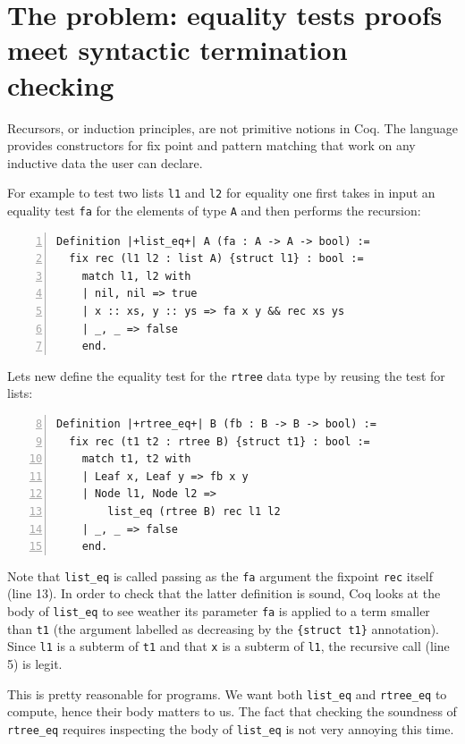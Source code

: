 \documentclass[sigplan,10pt,review]{acmart}\settopmatter{printfolios=true,printccs=false,printacmref=false}
\begin{document}
\section{The problem: equality tests proofs meet syntactic termination checking} %
\label{sec:problem}

Recursors, or induction principles, are not primitive notions in Coq.
The language provides constructors for fix point and pattern matching
that work on any inductive data the user can declare.

For example to test two lists \lstinline+l1+ and \lstinline+l2+ for
equality one first takes in input an equality test \lstinline+fa+
for the elements of type \lstinline+A+ and then performs the
recursion:
\begin{lstlisting}[numbers=left]
Definition |+list_eq+| A (fa : A -> A -> bool) :=
  fix rec (l1 l2 : list A) {struct l1} : bool :=
    match l1, l2 with
    | nil, nil => true
    | x :: xs, y :: ys => fa x y && rec xs ys
    | _, _ => false
    end.
\end{lstlisting}

\noindent
Lets new define the equality test for the \lstinline+rtree+ data type
by reusing the test for lists:

\begin{lstlisting}[numbers=left,firstnumber=8]
Definition |+rtree_eq+| B (fb : B -> B -> bool) :=
  fix rec (t1 t2 : rtree B) {struct t1} : bool :=
    match t1, t2 with
    | Leaf x, Leaf y => fb x y
    | Node l1, Node l2 =>
        list_eq (rtree B) rec l1 l2
    | _, _ => false
    end.
\end{lstlisting}

\noindent
Note that \lstinline+list_eq+ is called passing as the \lstinline+fa+
argument the fixpoint \lstinline+rec+ itself (line 13). In order to
check that the latter definition is sound, Coq looks at the body of
\lstinline+list_eq+ to see weather its parameter \lstinline+fa+ is
applied to a term smaller than \lstinline+t1+ (the argument labelled
as decreasing by the \lstinline+{struct t1}+ annotation). Since
\lstinline+l1+ is a subterm of \lstinline+t1+ and that \lstinline+x+
is a subterm of \lstinline+l1+, the recursive call (line 5) is legit.

This is pretty reasonable for programs. We want both \lstinline+list_eq+
and \lstinline+rtree_eq+ to compute, hence their body matters to us.
The fact that checking the soundness of \lstinline+rtree_eq+ requires
inspecting the body of \lstinline+list_eq+ is not very annoying this
time.
\end{document}
